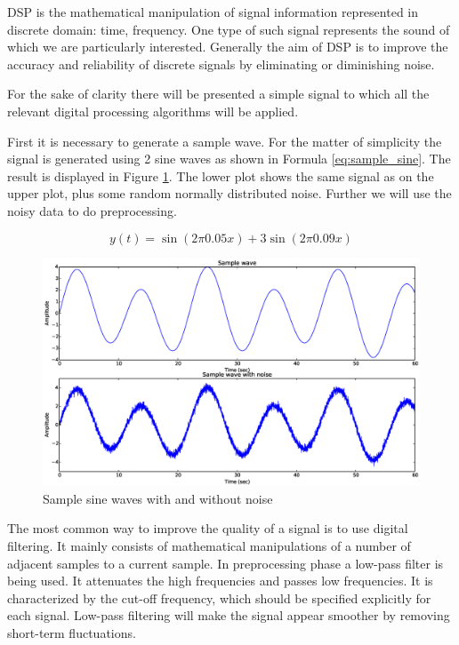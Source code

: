 \documentclass[12pt,a4paper]{report}
\begin{document}
DSP is the mathematical manipulation of signal information represented in discrete domain: time, frequency. One type of such signal represents the sound of which we are particularly interested. Generally the aim of DSP is to improve the accuracy and reliability of discrete signals by eliminating or diminishing noise.

For the sake of clarity there will be presented a simple signal to which all the relevant digital processing algorithms will be applied.

First it is necessary to generate a sample wave. For the matter of simplicity the signal is generated using 2 sine waves as shown in Formula \eqref{eq:sample_sine}. The result is displayed in Figure \ref{fig:sines}. The lower plot shows the same signal as on the upper plot, plus some random normally distributed noise. Further we will use the noisy data to do preprocessing.

\begin{equation} \label{eq:sample_sine}
 y(t) = \sin(2\pi 0.05 x) + 3\sin(2\pi 0.09 x)
\end{equation}


\begin{figure}[h]
\centering
  \includegraphics[max height=\textheight, max width=\textwidth, keepaspectratio, scale=0.7]{07_sine_wave.eps}
\caption{Sample sine waves with and without noise}
\label{fig:sines}
\end{figure}

The most common way to improve the quality of a signal is to use digital filtering. It mainly consists of mathematical manipulations of a number of adjacent samples to a current sample. In preprocessing phase a low-pass filter is being used. It attenuates the high frequencies and passes low frequencies. It is characterized by the cut-off frequency, which should be specified explicitly for each signal. Low-pass filtering will make the signal appear smoother by removing short-term fluctuations. 
\end{document}
